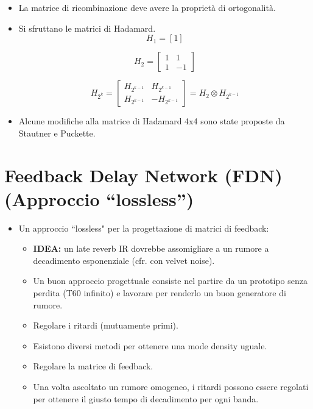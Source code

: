 \begin{itemize}
    \item La matrice di ricombinazione deve avere la proprietà di ortogonalità.
    \item Si sfruttano le matrici di Hadamard.
    \[
H_1 = [1]
\]

\[
H_2 = 
\begin{bmatrix}
1 & 1 \\
1 & -1
\end{bmatrix}
\]

\[
H_{2^k} = 
\begin{bmatrix}
H_{2^{k-1}} & H_{2^{k-1}} \\
H_{2^{k-1}} & -H_{2^{k-1}}
\end{bmatrix}
= H_2 \otimes H_{2^{k-1}}
\]

    \item Alcune modifiche alla matrice di Hadamard 4x4 sono state proposte da Stautner e Puckette.
\end{itemize}

\section{Feedback Delay Network (FDN) (Approccio ``lossless'')}

\begin{itemize}
    \item Un approccio ``lossless" per la progettazione di matrici di feedback:
    \begin{itemize}
        \item \textbf{IDEA:} un late reverb IR dovrebbe assomigliare a un rumore a decadimento esponenziale (cfr. con velvet noise).
        \item Un buon approccio progettuale consiste nel partire da un prototipo senza perdita (T60 infinito) e lavorare per renderlo un buon generatore di rumore.
        \item Regolare i ritardi (mutuamente primi).
        \item Esistono diversi metodi per ottenere una mode density uguale.
        \item Regolare la matrice di feedback.
        \item Una volta ascoltato un rumore omogeneo, i ritardi possono essere regolati per ottenere il giusto tempo di decadimento per ogni banda.
    \end{itemize}
\end{itemize}
